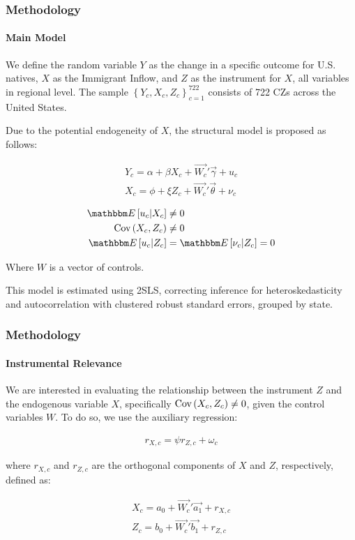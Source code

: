 
\begin{frame}
    \frametitle{Methodology}
    \framesubtitle{Main Model}

    We define the random variable $Y$ as the change in a specific outcome for U.S. natives, $X$ as the Immigrant Inflow, and $Z$ as the instrument for $X$, all variables in regional level. The sample $\left\{Y_c, X_c, Z_c\right\}_{c = 1}^{722}$ consists of 722 CZs across the United States.
    
    Due to the potential endogeneity of $X$, the structural model is proposed as follows:

    \begin{align}
        Y_c = \alpha +  \beta X_c + \Vec{W_c}'\Vec{\gamma} + u_c \\
        X_c = \phi + \xi Z_c + \Vec{W_c}'\Vec{\theta} + \nu_c\\
    \end{align}
    \begin{align}
        \E{u_c | X_c} &\neq 0 \\
        \cov{X_c, Z_c} &\neq 0 \\
        \E{u_c | Z_c} &= \E{\nu_c | Z_c} = 0
    \end{align}

    Where $W$ is a vector of controls.
    
    This model is estimated using 2SLS, correcting inference for heteroskedasticity and autocorrelation with clustered robust standard errors, grouped by state.
\end{frame}


\begin{frame}
    \frametitle{Methodology}
    \framesubtitle{Instrumental Relevance}
    We are interested in evaluating the relationship between the instrument $Z$ and the endogenous variable $X$, specifically $\text{Cov}\left(X_c, Z_c\right) \neq 0$, given the control variables $W$. To do so, we use the auxiliary regression:

    \begin{align}
        r_{X,c} = \psi r_{Z,c} + \omega_{c}
        \label{eq:auxiliary}
    \end{align}
    
    where $r_{X,c}$ and $r_{Z,c}$ are the orthogonal components of $X$ and $Z$, respectively, defined as:
    
    \begin{align}
        X_c = a_0 + \Vec{W_c}'\Vec{a_1} + r_{X,c} \\
        Z_c = b_0 + \Vec{W_c}'\Vec{b_1} + r_{Z,c}
    \end{align}
    
\end{frame}

